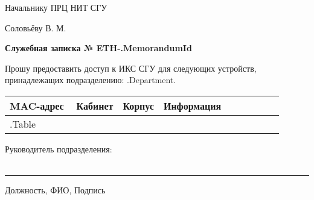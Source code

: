 \documentclass[12pt]{article}
\begin{document}
    \begin{flushright}
        Начальнику ПРЦ НИТ СГУ

        Соловьёву В. М. \\[50pt]
    \end{flushright}

    \begin{center}
        \large
        \textbf{Служебная записка № ETH-{{.MemorandumId}} } \\[20pt]
    \end{center}
    \begin{flushleft}
        \large
        Прошу предоставить доступ к ИКС СГУ для следующих устройств, принадлежащих подразделению: {{.Department}}.
    \end{flushleft}




    \begin{table}[!h]
        \large
        \centering
        \label{my-label}
        \begin{tabular}{|p{0.25\linewidth}|p{0.10\linewidth}|p{0.10\linewidth}|p{0.45\linewidth}|}
            \hline
            MAC-адрес & Кабинет & Корпус & Информация \\
            \hline
            {{.Table}}
        \end{tabular}
    \end{table}



    \normalsize
    \begin{flushleft}
        \large
        Руководитель подразделения:\\~\\
    \end{flushleft}
    \centering
    \noindent\rule{550pt}{0.4pt}
    \large
    Должность, ФИО, Подпись\\[50pt]
\end{document}
